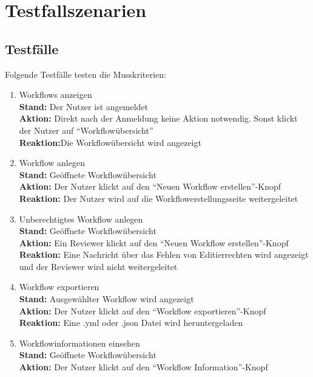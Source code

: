 \chapter{Testfallszenarien}

\section{Testfälle}
Folgende Testfälle testen die Musskriterien:
\renewcommand{\labelenumi}{/T\arabic{enumi}0/}
\begin{enumerate}
    \item Workflows anzeigen
    \\ \textbf{Stand:} Der \Gls{Nutzer} ist angemeldet
    \\ \textbf{Aktion:} Direkt nach der Anmeldung keine Aktion notwendig. Sonst klickt der \Gls{Nutzer} auf \enquote{Workflowübersicht}
    \\ \textbf{Reaktion:}Die Workflowübersicht wird angezeigt
    \item Workflow anlegen
    \\ \textbf{Stand:} Geöffnete Workflowübersicht
    \\ \textbf{Aktion:} Der \Gls{Nutzer} klickt auf den \enquote{Neuen Workflow erstellen}-Knopf
    \\ \textbf{Reaktion:} Der \Gls{Nutzer} wird auf die Workflowerstellungsseite weitergeleitet
    \item Unberechtigtes Workflow anlegen
    \\ \textbf{Stand:} Geöffnete Workflowübersicht
    \\ \textbf{Aktion:} Ein \Gls{Reviewer} klickt auf den \enquote{Neuen Workflow erstellen}-Knopf
    \\ \textbf{Reaktion:} Eine Nachricht über das Fehlen von Editierrechten wird angezeigt und der \Gls{Reviewer} wird nicht weitergeleitet
    \item Workflow exportieren
    \\ \textbf{Stand:} Ausgewählter Workflow wird angezeigt
    \\ \textbf{Aktion:} Der \gls{Nutzer} klickt auf den \enquote{Workflow exportieren}-Knopf
    \\ \textbf{Reaktion:} Eine .yml oder .json Datei wird heruntergeladen
    \item Workflowinformationen einsehen
    \\ \textbf{Stand:} Geöffnete Workflowübersicht
    \\ \textbf{Aktion:} Der \gls{Nutzer} klickt auf den \enquote{Workflow Information}-Knopf

\end{enumerate}
